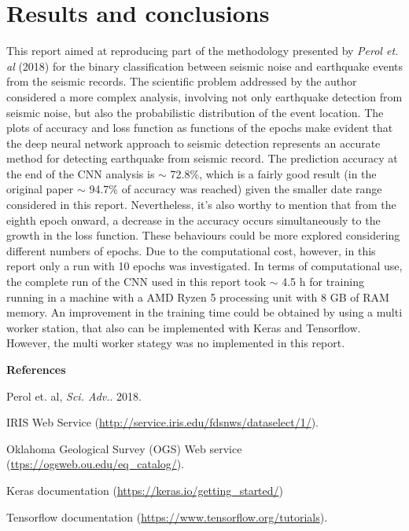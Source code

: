 \documentclass{article}
\begin{document}
\section{Results and conclusions}

This report aimed at reproducing part of the methodology presented by \textit{Perol et. al} (2018) for the binary classification between seismic noise and earthquake events from the seismic records. The scientific problem addressed by the author considered a more complex analysis, involving not only earthquake detection from seismic noise, but also the probabilistic distribution of the event location. The plots of accuracy and loss function as functions of the epochs make evident that the deep neural network approach to seismic detection represents an accurate method for detecting earthquake from seismic record. The prediction accuracy at the end of the CNN analysis is $\sim$ 72.8\%, which is a fairly good result (in the original paper $\sim$ 94.7\% of accuracy was reached) given the smaller date range considered in this report. Nevertheless, it's also worthy to mention that from the eighth epoch onward, a decrease in the accuracy occurs simultaneously to the growth in the loss function. These behaviours could be more explored considering different numbers of epochs. Due to the computational cost, however, in this report only a run with 10 epochs was investigated. In terms of computational use, the complete run of the CNN used in this report took $\sim$ 4.5 h for training running in a machine with a AMD Ryzen 5 processing unit with 8 GB of RAM memory. An improvement in the training time could be obtained by using a multi worker station, that also can be implemented with Keras and Tensorflow. However, the multi worker stategy was no implemented in this report.  

\vspace*{0.5cm}

\textbf{\Large{References}}

\vspace*{0.5cm}

\noindent [1] Perol et. al, \textit{Sci. Adv.}. 2018.

\noindent [2] IRIS Web Service (\url{http://service.iris.edu/fdsnws/dataselect/1/}).

\noindent [3] Oklahoma Geological Survey (OGS) Web service (\url{ttps://ogsweb.ou.edu/eq_catalog/}). 

\noindent [4] Keras documentation (\url{https://keras.io/getting_started/})

\noindent [5] Tensorflow documentation (\url{https://www.tensorflow.org/tutorials}).
\end{document}
